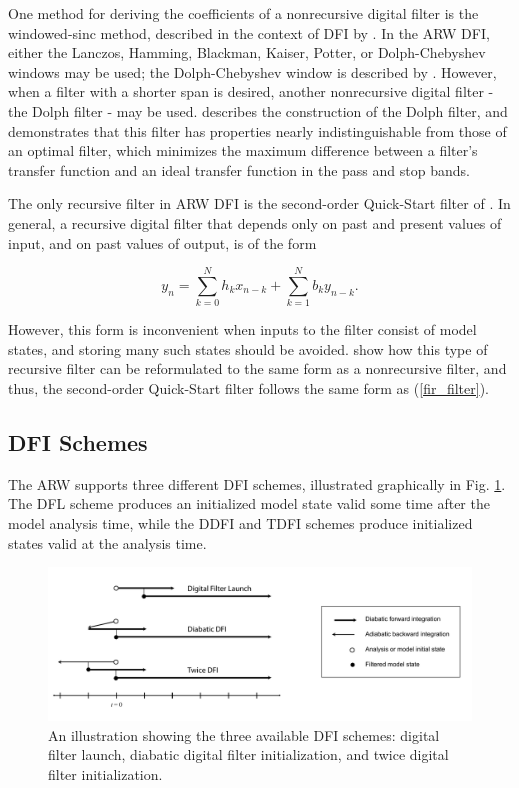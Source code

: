 One method for deriving the coefficients of a nonrecursive digital filter is 
the windowed-sinc method, described in the context of DFI by \cite{lynchhuang92}. 
In the ARW DFI, either the Lanczos, Hamming, Blackman, Kaiser, Potter, or 
Dolph-Chebyshev windows may be used; the Dolph-Chebyshev window is described 
by \cite{lynch97}. However, when a filter with a shorter span is desired, 
another nonrecursive digital filter - the Dolph filter - may be used. \cite{lynch97} 
describes the construction of the Dolph filter, and demonstrates that this 
filter has properties nearly indistinguishable from those of an optimal filter, 
which minimizes the maximum difference between a filter's transfer function 
and an ideal transfer function in the pass and stop bands. 

The only recursive filter in ARW DFI is the second-order Quick-Start 
filter of \cite{lynchhuang94}. In general, a recursive digital filter that 
depends only on past and present values of input, and on past values of 
output, is of the form

\begin{equation}
y_n = \sum_{k=0}^{N} h_k x_{n-k} + \sum_{k=1}^{N} b_k y_{n-k}.
\end{equation}

\noindent
However, this form is inconvenient when inputs to the filter consist of 
model states, and storing many such states should be avoided. \cite{lynchhuang94} 
show how this type of recursive filter can be reformulated to the same 
form as a nonrecursive filter, and thus, the second-order 
Quick-Start filter follows the same form as (\ref{fir_filter}).

\subsection{DFI Schemes}

The ARW supports three different DFI schemes, illustrated graphically in 
Fig. \ref{figure:dfi_types}. The DFL scheme produces an initialized model 
state valid some time after the model analysis time, while the DDFI and TDFI 
schemes produce initialized states valid at the analysis time.

%
%
\begin{figure}
  \centering
  \includegraphics[width=6.5in]{figures/dfi_schemes.pdf}
  \caption{\label{figure:dfi_types}An illustration showing the three available DFI schemes: digital filter 
  launch, diabatic digital filter initialization, and twice digital filter initialization.}
\end{figure}

